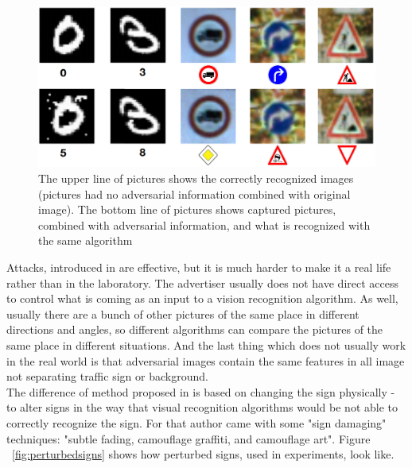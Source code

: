 \begin{figure}[h]
	\centering  	
	\includegraphics[width=15cm]{img/WrongPictures.png}
	\caption{The upper line of pictures shows the correctly recognized images (pictures had no adversarial information combined with original image). The bottom line of pictures shows captured pictures, combined with adversarial information, and what is recognized with the same algorithm \cite{blackBox1}}
	\label{fig:WrongPictures}    
\end{figure}

Attacks, introduced in \cite{blackBox1} are effective, but it is much harder to make it a real life rather than in the laboratory. The advertiser usually does not have direct access to control what is coming as an input to a vision recognition algorithm. As well, usually there are a bunch of other pictures of the same place in different directions and angles, so different algorithms can compare the pictures of the same place in different situations. And the last thing which does not usually work in the real world is that adversarial images contain the same features in all image not separating traffic sign or background. \\
The difference of method proposed in \cite{signs} is based on changing the sign physically - to alter signs in the way that visual recognition algorithms would be not able to correctly recognize the sign. For that author came with some "sign damaging" techniques: "subtle fading, camouflage graffiti, and camouflage art". Figure ~\ref{fig:perturbedsigns} shows how perturbed signs, used in experiments, look like.

